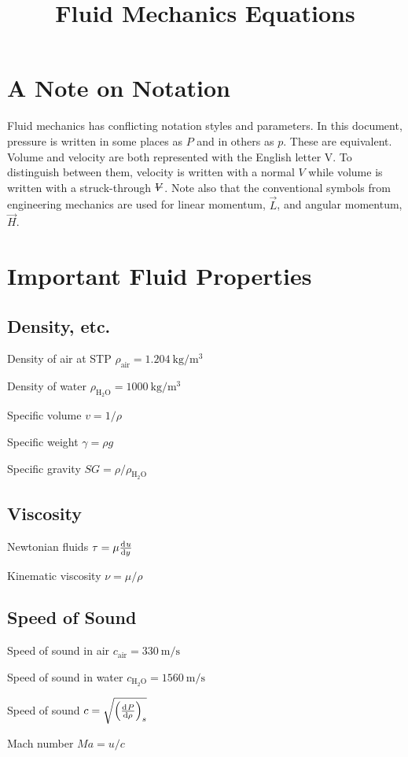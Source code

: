\documentclass{article}
\title{Fluid Mechanics Equations}
\begin{document}


\section*{A Note on Notation}

Fluid mechanics has conflicting notation styles and parameters.  In this document, pressure is
written in some places as $P$ and in others as $p$. These are equivalent.  Volume and velocity are
both represented with the English letter V.  To distinguish between them, velocity is written with a
normal $V$ while volume is written with a struck-through $\volsym$.  Note also that the conventional
symbols from engineering mechanics are used for linear momentum, $\vec{L}$, and angular momentum,
$\vec{H}$.

\section{Important Fluid Properties}

\subsection{Density, etc.}
\begin{description*}
\item[Density of air at STP]
  \(\rho_\mathrm{air} = \SI{1.204}{\kilo\gram\per\cubic\meter}\)
\item[Density of water]
  \(\rho_\mathrm{H_2O} = \SI{1000}{\kilo\gram\per\cubic\meter}\)
\item[Specific volume]
  \(v = 1/\rho\)
\item[Specific weight]
  \(\gamma = \rho g\)
\item[Specific gravity]
  \(\mathit{SG} = \rho / \rho_\mathrm{H_2O}\)
\end{description*}

\subsection{Viscosity}
\begin{description*}
\item[Newtonian fluids]
  \(\tau = \mu \od{u}{y}\)
\item[Kinematic viscosity]
  \(\nu = \mu / \rho\)
\end{description*}

\subsection{Speed of Sound}
\begin{description*}
\item[Speed of sound in air]
  \(c_\mathrm{air} = \SI{330}{\meter\per\second}\)
\item[Speed of sound in water]
  \(c_\mathrm{H_2O} = \SI{1560}{\meter\per\second}\)
\item[Speed of sound]
  \(c = \sqrt{{\left(\od{P}{\rho}\right)}_s}\)
\item[Mach number]
  \(\mathit{Ma} = u/c\)
\end{description*}
\end{document}
